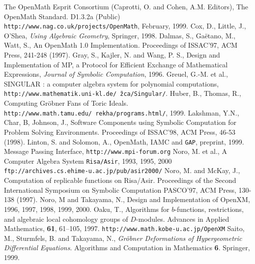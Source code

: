 
\begin{thebibliography}{X}
The OpenMath Esprit Consortium 
(Caprotti, O. and Cohen, A.M. Editors),
The OpenMath Standard. D1.3.2a (Public) \\
{\footnotesize \tt http://www.nag.co.uk/projects/OpenMath},
February, 1999.
Cox, D., Little, J.,  O'Shea,
{\it Using Algebraic Geometry}, Springer, 1998.
Dalmas, S., Ga\"etano, M., Watt, S., An OpenMath 1.0 Implementation.
Proceedings of ISSAC'97, ACM Press, 241-248 (1997).
Gray, S., Kajler, N. and Wang, P. S.,
Design and Implementation of MP, a Protocol for Efficient
  Exchange of Mathematical Expressions,
{\sl Journal of Symbolic Computation}, 1996.
Greuel, G.-M. et al., SINGULAR : a computer algebra system for polynomial
computations, \\
{\tt http://www.mathematik.uni-kl.de/\~\,zca/Singular/}.
Huber, B., Thomas, R., Computing Gr\"obner Fans of Toric Ideals.
{\tt http://www.math.tamu.edu/~rekha/programs.html/}, 1999.
Lakshman, Y.N., Char, B, Johnson, J., Software Components using
Symbolic Computation for Problem Solving Environments.
Proceedings of ISSAC'98, ACM Press, 46-53 (1998).
Linton, S. and Solomon, A.,
OpenMath, IAMC and {\tt GAP},
preprint, 1999.
 Message Passing Interface,
{\tt http://www.mpi-forum.org} 
Noro, M. et al., 
A Computer Algebra System {\tt Risa/Asir},  1993, 1995, 2000\\
{\tt ftp://archives.cs.ehime-u.ac.jp/pub/asir2000/}
Noro, M. and McKay, J.,
Computation of replicable functions on Risa/Asir.
Proceedings of the Second International Symposium on
Symbolic Computation PASCO'97, ACM Press, 130-138 (1997).
Noro, M and Takayama, N., Design and Implementation
of OpenXM, 1996, 1997, 1998, 1999, 2000.
Oaku, T.,
Algorithms for $b$-functions, restrictions, and algebraic local cohomology
groups of $D$-modules.
Advances in Applied Mathematics, {\bf 61}, 61--105, 1997.
{\footnotesize {\tt http://www.math.kobe-u.ac.jp/OpenXM}}
Saito, M., Sturmfels, B. and Takayama, N.,
{\it Gr\"obner Deformations of Hypergeometric Differential Equations}.
Algorithms and Computation in Mathematics {\bf 6}. Springer, 1999.

\end{thebibliography}
